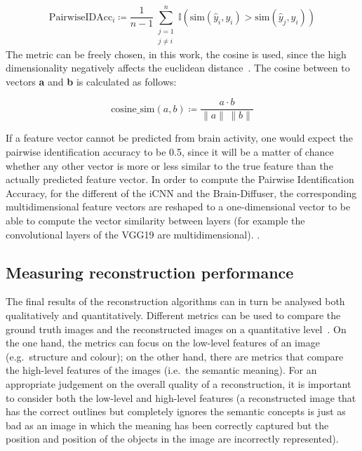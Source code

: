 \[ %
\text{PairwiseIDAcc}_i \coloneq \frac{1}{n-1} \sum_{\substack{j=1 \\ j \neq i}}^{n} \mathbb{I} \left(  \text{sim}\left(\hat{y}_{i}, y_{i}\right)  > \text{sim}\left(\hat{y}_{j}, y_{i} \right) \right)
\]
\noindent{} The  metric can be freely chosen, in this work, the cosine  is used, since the high dimensionality negatively affects the euclidean distance~\cite{koppen2000curse}. The cosine  between to vectors \textbf{a} and \textbf{b} is calculated as follows:

\[
\text{cosine\_sim}(a, b) \coloneq \frac{a \cdot b}{\|a\| \, \|b\|}
\]

\noindent{}If a feature vector cannot be predicted from brain activity, one would expect the pairwise identification accuracy to be 0.5, since it will be a matter of chance whether any other vector is  more or less similar to the true feature than the actually predicted feature vector. In order to compute the Pairwise Identification Accuracy, for the different  of the iCNN and the Brain-Diffuser, the corresponding multidimensional feature vectors are reshaped to a one-dimensional vector to be able to compute the vector similarity between layers (for example the convolutional layers of the VGG19 are multidimensional). . 


\subsection{Measuring reconstruction performance}

The final results of the reconstruction algorithms can in turn be analysed both qualitatively and quantitatively. Different metrics can be used to compare the ground truth images and the reconstructed images on a quantitative level~\cite{ozcelikNaturalSceneReconstruction2023}. On the one hand, the metrics can focus on the low-level features of an image (e.g.\ structure and colour); on the other hand, there are metrics that compare the high-level features of the images (i.e.\ the semantic meaning). For an appropriate judgement on the overall quality of a reconstruction, it is important to consider both the low-level and high-level features (a reconstructed image that has the correct outlines but completely ignores the semantic concepts is just as bad as an image in which the meaning has been correctly captured but the position and position of the objects in the image are incorrectly represented).

